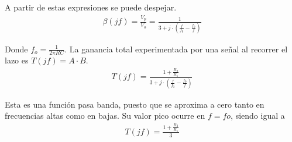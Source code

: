 A partir de estas expresiones se puede despejar.
\begin{align}
\beta (jf)=\frac{V_p}{V_o}=\frac{1}{3+j\cdot \left( \frac{f}{f_0}-\frac{f_0}{f} \right) }
\end{align}

Donde $f_o = \frac{1}{2\pi RC}$. La ganancia total experimentada por una señal al recorrer el lazo es
$T(jf)=A \cdot B$.
\begin{align}
T (jf)=\frac{1+\frac{R_2}{R_1}}{3+j\cdot \left( \frac{f}{f_0}-\frac{f_0}{f} \right) }
\end{align}

Esta es una función pasa banda, puesto que se aproxima a cero tanto en frecuencias altas como en bajas. Su valor pico ocurre en $f= fo$, siendo igual a
\begin{align}
	T (jf)=\frac{1+\frac{R_2}{R_1}}{3}
\label{eq:107}
\end{align}

